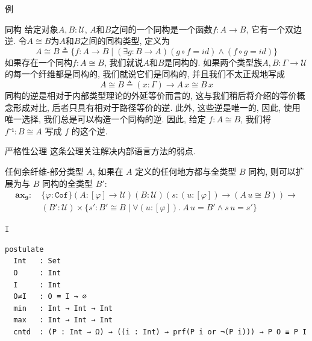 \documentclass[aspectratio=169,xcolor=dvipsnames]{beamer}
\newcommand\calU{\mathcal{U}}
\newcommand{\ax}[1]{\mathbf{ax_{#1}}}
\newcommand\Cof{\mathtt{Cof}}
\begin{document}
\begin{frame}{例}
\end{frame}

\begin{frame}{同构}
  给定对象$A,B:\calU$, $A$和$B$之间的一个同构是一个函数$f:A\to B$, 它有一个双边逆. 令$A\cong B$为$A$和$B$之间的同构类型, 定义为
  \[
  A\cong B\triangleq \{f:A\to B\mid(\exists g:B\to A)(g\circ f=id)\land(f\circ g=id)\}
  \]
  如果存在一个同构$f:A\cong B$, 我们就说$A$和$B$是同构的. 如果两个类型族$A,B:\Gamma\to\calU$的每一个纤维都是同构的, 我们就说它们是同构的, 并且我们不太正规地写成
  \[
  A\cong B \triangleq (x:\Gamma)\to A\,x\cong B\,x
  \]
  同构的逆是相对于内部类型理论的外延等价而言的, 这与我们稍后将介绍的等价概念形成对比, 后者只具有相对于路径等价的逆. 此外, 这些逆是唯一的, 因此, 使用唯一选择, 我们总是可以构造一个同构的逆. 因此, 给定 $f : A ≅ B$, 我们将 $f⁻¹ : B ≅ A$ 写成 $f$ 的这个逆.
\end{frame}

\begin{frame}[shrink]{严格性公理}
  这条公理关注解决内部语言方法的弱点.

  \bigskip

  任何余纤维-部分类型 $A$, 如果在 $A$ 定义的任何地方都与全类型 $B$ 同构, 则可以扩展为与 $B$ 同构的全类型 $B'$:
  \begin{align*}
    \ax{9} :\ &\{\varphi:\Cof\}(A:[\varphi]\to\calU)(B:\calU)(s:(u:[\varphi])\to(A\,u\cong B)) \to \\
    &(B':\calU)\times\{s':B'\cong B\mid\forall(u:[\varphi]).\ A\,u=B'\land s\,u=s'\}
  \end{align*}
\end{frame}

\begin{frame}[fragile]{$\mathtt{I}$}
\begin{verbatim}
postulate
  Int   : Set
  O     : Int
  I     : Int
  O≠I   : O ≡ I → ∅
  min   : Int → Int → Int
  max   : Int → Int → Int
  cntd  : (P : Int → Ω) → ((i : Int) → prf(P i or ¬(P i))) → P O ≡ P I
\end{verbatim}
\end{frame}
\end{document}
